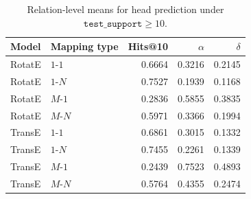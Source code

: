 \begin{table}[H]
    \centering
    \caption{Relation-level means for head prediction under
    \(\texttt{test\_support}\geq 10\).}
    \label{tab:mapping-type-head-summary}
    \small
    \begin{tabular}{llrrr}
        \toprule
        Model & Mapping type & Hits@10 & \(\alpha\) & \(\delta\) \\
        \midrule
        RotatE & \(1\)-\(1\) & 0.6664 & 0.3216 & 0.2145 \\
        RotatE & \(1\)-\(N\) & 0.7527 & 0.1939 & 0.1168 \\
        RotatE & \(M\)-\(1\) & 0.2836 & 0.5855 & 0.3835 \\
        RotatE & \(M\)-\(N\) & 0.5971 & 0.3366 & 0.1994 \\
        TransE & \(1\)-\(1\) & 0.6861 & 0.3015 & 0.1332 \\
        TransE & \(1\)-\(N\) & 0.7455 & 0.2261 & 0.1339 \\
        TransE & \(M\)-\(1\) & 0.2439 & 0.7523 & 0.4893 \\
        TransE & \(M\)-\(N\) & 0.5764 & 0.4355 & 0.2474 \\
        \bottomrule
    \end{tabular}
\end{table}
